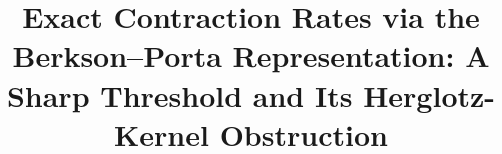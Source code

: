 \documentclass[pdflatex,sn-mathphys-num]{sn-jnl}%
\theoremstyle{thmstyleone}%
\theoremstyle{thmstyletwo}%
\theoremstyle{thmstylethree}%
\begin{document}
\title{Exact Contraction Rates via the Berkson--Porta Representation: A Sharp Threshold and Its Herglotz-Kernel Obstruction}


%
%
%
%
%

\author*[1]{ }


\end{document}
